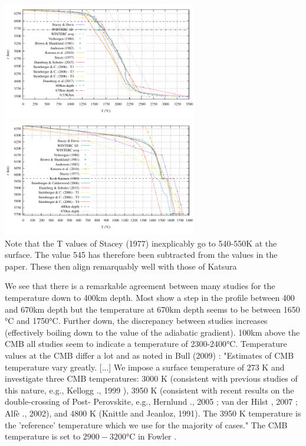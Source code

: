 \begin{center}
\includegraphics[width=8.5cm]{images/adiabatic/Tprofile.pdf}
\includegraphics[width=8.5cm]{images/adiabatic/Tprofile_upper.pdf}\\
{\captionfont 
Note that the T values of Stacey (1977) \cite{stac77} inexplicably go to 540-550K at the surface. 
The value 545 has therefore been subtracted from the values in the paper. These then 
align remarquably well with those of Katsura \etal
}
\end{center}




We see that there is a remarkable agreement between many studies for the temperature down to 400km 
depth. Most show a step in the profile between 400 and 670km depth but the temperature at 670km
depth seems to be between 1650$\si{\celsius}$ and 1750$\si{\celsius}$.
Further down, the discrepancy between studies increases (effectively boiling down to 
the value of the adiabatic gradient). 100km above the CMB all studies seem to indicate a 
temperature of 2300-2400$\si{\celsius}$. Temperature values at the CMB differ a lot and 
as noted in Bull \etal (2009) \cite{bumr09}: 
"Estimates of CMB temperature vary greatly. [...] 
We impose a surface temperature of 273 K and
investigate three CMB temperatures: 3000 K (consistent with
previous studies of this nature, e.g., Kellogg \etal., 1999 \cite{kehv99}), 3950 K
(consistent with recent results on the double-crossing of Post-
Perovskite, e.g., Hernlund \etal., 2005 \cite{hett05}; van der Hilst \etal, 
2007 \cite{vadw07}; Alf\`e \etal., 2002), and 4800 K (Knittle and Jeanloz, 1991). The 3950 K
temperature is the 'reference' temperature which we use for the
majority of cases."
The CMB temperature is set to $2900-3200\si{\celsius}$ in Fowler \cite{fowler}.


